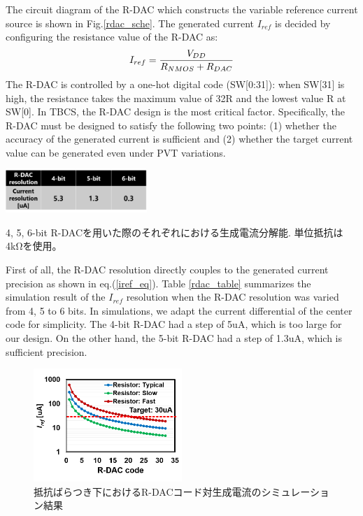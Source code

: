 \documentclass[letterpaper, 10 pt, conference]{ieeeconf}  %
\begin{document}
The circuit diagram of the R-DAC which constructs the variable reference current source is shown in Fig.\ref{rdac_sche}. The generated current $I_{ref}$ is decided by configuring the resistance value of the R-DAC as:
\begin{eqnarray}
    \centering
     I_{ref} = \frac{V_{DD}}{R_{NMOS}+R_{DAC}}
    \label{iref_eq}
\end{eqnarray}
The R-DAC is controlled by a one-hot digital code (SW[0:31]): when SW[31] is high, the resistance takes the maximum value of 32R and the lowest value R at SW[0]. In TBCS, the R-DAC design is the most critical factor. Specifically, the R-DAC must be designed to satisfy the following two points: (1) whether the accuracy of the generated current is sufficient and (2) whether the target current value can be generated even under PVT variations.

\begin{table}[]
\centering
 \includegraphics[width=0.4\textwidth]{figs/rdac_table.png}
  \caption{4, 5, 6-bit R-DACを用いた際のそれぞれにおける生成電流分解能. 単位抵抗は4kΩを使用。}
\label{rdac_table}
\end{table}

First of all, the R-DAC resolution directly couples to the generated current precision as shown in eq.(\ref{iref_eq}). Table \ref{rdac_table} summarizes the simulation result of the $I_{ref}$ resolution when the R-DAC resolution was varied from 4, 5 to 6 bits. In simulations, we adapt the current differential of the center code for simplicity. The 4-bit R-DAC had a step of 5uA, which is too large for our design. On the other hand, the 5-bit R-DAC had a step of 1.3uA, which is sufficient precision.

\begin{figure}[!]
\centering
 \includegraphics[width=0.5\textwidth]{figs/rdaccode.png}
  \caption{抵抗ばらつき下におけるR-DACコード対生成電流のシミュレーション結果}
\label{rdac_pvt}
\end{figure}
\end{document}
